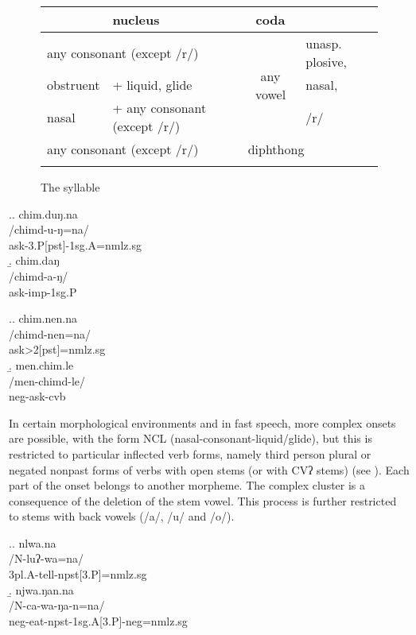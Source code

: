  \begin{figure}[htp]	
 \begin{center}		
\begin{tabular}{ll|c|l}
\lsptoprule
\multicolumn{2}{l|}{{\sc onset}}&\multicolumn{1}{l|}{\sc nucleus}&{\sc coda}\\
\hline
\multicolumn{2}{l|}{any consonant (except /r/)}& \multirow{3}{*}{any vowel} & unasp. plosive,\\
\cline{1-2}
obstruent&+ liquid, glide & & nasal,\\
\cline{1-2}
nasal&+ any consonant (except /r/)& & /r/\\
\hline
\multicolumn{2}{l|}{any consonant (except /r/)}&\multicolumn{2}{l}{diphthong}\\
\lspbottomrule
\end{tabular}
\caption{The syllable}\label{syll}
\end{center}
\end{figure}


\ex.\a. \glll chim.duŋ.na\\
/chimd-u-ŋ=na/\\
ask{\sc -3.P[pst]-1sg.A=nmlz.sg}\\
\b. \glll chim.daŋ\\
/chimd-a-ŋ/\\
ask{\sc -imp-1sg.P}\\

\ex.\a. \glll chim.nen.na\\
/chimd-nen=na/\\
ask{>2[pst]=nmlz.sg}\\
\b. \glll men.chim.le\\
/men-chimd-le/\\
{\sc neg-}ask{\sc -cvb}\\


In certain morphological environments and in fast speech, more complex onsets are possible, with the form NCL (nasal-consonant-liquid/glide), but this is restricted to particular inflected verb forms, namely third person plural or negated nonpast forms of verbs with open stems (or with CVʔ stems) (see \Next). Each part of the onset belongs to another morpheme. The complex cluster is a consequence of the deletion of the stem vowel. This process is further restricted to stems with back vowels (/a/, /u/ and /o/). 



\ex.\a. \glll nlwa.na\\
/N-luʔ-wa=na/\\
{\sc 3pl.A-}tell{\sc -npst[3.P]=nmlz.sg}\\
\b. \glll njwa.ŋan.na\\
/N-ca-wa-ŋa-n=na/\\
{\sc neg-}eat{\sc -npst-1sg.A[3.P]-neg=nmlz.sg}\\



